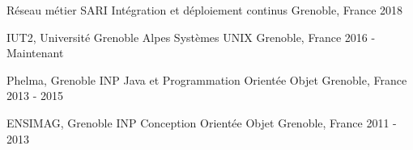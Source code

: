 

\begin{cventries}

  \cventrynodescr
    {Réseau métier SARI} %
    {Intégration et déploiement continus} %
    {Grenoble, France} %
    {2018} %

  \cventrynodescr
    {IUT2, Université Grenoble Alpes} %
    {Systèmes UNIX} %
    {Grenoble, France} %
    {2016 - Maintenant} %

  \cventrynodescr
    {Phelma, Grenoble INP} %
    {Java et Programmation Orientée Objet} %
    {Grenoble, France} %
    {2013 - 2015} %

  \cventrynodescr
    {ENSIMAG, Grenoble INP} %
    {Conception Orientée Objet} %
    {Grenoble, France} %
    {2011 - 2013} %
    
\end{cventries}
